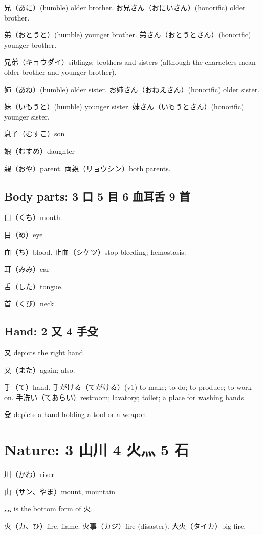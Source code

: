 兄（あに）(humble) older brother.
お兄さん（おにいさん）(honorific) older brother.

弟（おとうと）(humble) younger brother.
弟さん（おとうとさん）(honorific) younger brother.

兄弟（キョウダイ）siblings;
brothers and sisters
(although the characters mean older brother and younger brother).

姉（あね）(humble) older sister.
お姉さん（おねえさん）(honorific) older sister.

妹（いもうと）(humble) younger sister.
妹さん（いもうとさん）(honorific) younger sister.

息子（むすこ）son

娘（むすめ）daughter

親（おや）parent.
両親（リョウシン）both parents.

\subsection{Body parts: 3 口 5 目 6 血耳舌 9 首}

口（くち）mouth.

目（め）eye

血（ち）blood.
止血（シケツ）stop bleeding; hemostasis.

耳（みみ）ear

舌（した）tongue.

首（くび）neck

\subsection{Hand: 2 又 4 手殳}

又 depicts the right hand.

又（また）again; also.

手（て）hand.
手がける（てがける）(v1) to make; to do; to produce; to work on.
手洗い（てあらい）restroom; lavatory; toilet; a place for washing hands

殳 depicts a hand holding a tool or a weapon.

\section{Nature: 3 山川 4 火灬 5 石}

川（かわ）river

山（サン、やま）mount, mountain

灬 is the bottom form of 火.

火（カ、ひ）fire, flame.
火事（カジ）fire (disaster).
大火（タイカ）big fire.

